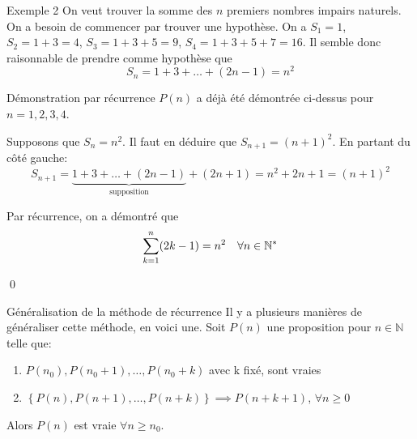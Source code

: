 \documentclass[a4paper]{article}
\begin{document}
\begin{parag}{Exemple 2}
    On veut trouver la somme des $n$ premiers nombres impairs naturels. On a besoin de commencer par trouver une hypothèse. On a $S_1 = 1$, $S_2 = 1 + 3 = 4$, $S_3 = 1 + 3 + 5 = 9$, $S_4 = 1 + 3 + 5 + 7 = 16$. Il semble donc raisonnable de prendre comme hypothèse que 
    \[S_n = 1 + 3 + \ldots + \left(2n - 1\right) = n^2\]
    
    \begin{subparag}{Démonstration par récurrence}
         $P\left(n\right)$ a déjà été démontrée ci-dessus pour $n = 1, 2, 3, 4$.

        \vspace{1em}

         Supposons que $S_n = n^2$. Il faut en déduire que $S_{n+1} = \left(n+1\right)^2$. En partant du côté gauche: 
        \[S_{n+1} = \underbrace{1 + 3 + \ldots + \left(2n - 1\right)}_{\text{supposition}} + \left(2n + 1\right) = n^2 + 2n + 1 = \left(n + 1\right)^2\]

        \vspace{1em}
         Par récurrence, on a démontré que 
        \[\sum_{k=1}^{n} \left(2k - 1\right) = n^2 \mathspace \forall n \in \mathbb{N}^*\]
        
        \qed
    \end{subparag}
\end{parag}


\begin{parag}{Généralisation de la méthode de récurrence}
    Il y a plusieurs manières de généraliser cette méthode, en voici une. Soit $P\left(n\right)$ une proposition pour $n \in \mathbb{N}$ telle que:
    \begin{enumerate}
        \item $P\left(n_0\right), P\left(n_0 + 1\right), \ldots, P\left(n_0 + k\right)$ avec k fixé, sont vraies 
        \item $\left\{P\left(n\right), P\left(n+1\right), \ldots, P\left(n+k\right)\right\} \implies P\left(n + k + 1\right)$, $\forall n \geq 0$
    \end{enumerate}

    Alors $P\left(n\right)$ est vraie $\forall n \geq n_0$.
    
    
\end{parag}
\end{document}
